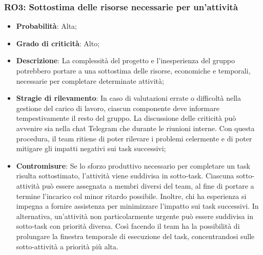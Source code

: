 \subsubsection{RO3: Sottostima delle risorse necessarie per un'attività}
\begin{itemize}
    \item \textbf{Probabilità}: Alta;
    \item \textbf{Grado di criticità}: Alto;
    \item \textbf{Descrizione}: La complessità del progetto e l'inesperienza del gruppo potrebbero portare a una sottostima delle risorse, economiche e temporali, necessarie per completare determinate attività;
    \item \textbf{Stragie di rilevamento}: In caso di valutazioni errate o difficoltà nella gestione del carico di lavoro, ciascun componente deve informare tempestivamente il resto del gruppo. La discussione delle criticità può avvenire sia nella chat Telegram che durante le riunioni interne. Con questa procedura, il team ritiene di poter rilevare i problemi celermente e di poter mitigare gli impatti negativi sui task successivi;
    \item \textbf{Contromisure}: Se lo sforzo produttivo necessario per completare un task risulta sottostimato, l'attività viene suddivisa in sotto-task. Ciascuna sotto-attività può essere assegnata a membri diversi del team, al fine di portare a termine l’incarico col minor ritardo possibile. Inoltre, chi ha esperienza si impegna a fornire assistenza per minimizzare l'impatto sui task successivi. In alternativa, un’attività non particolarmente urgente può essere suddivisa in sotto-task con priorità diversa. Così facendo il team ha la possibilità di prolungare la finestra temporale di esecuzione del task, concentrandosi sulle sotto-attività a priorità più alta.
\end{itemize}
